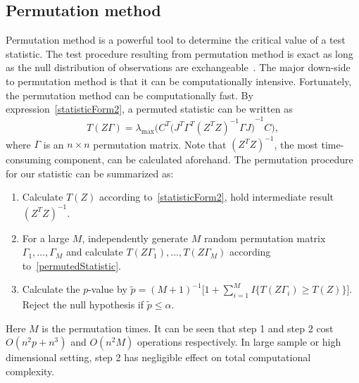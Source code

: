 \documentclass[12pt]{article} %
\theoremstyle{definition}
\begin{document}
\subsection{Permutation method}
Permutation method is a powerful tool to determine the critical value of a test statistic.
   The test procedure resulting from permutation method is exact as long as the null distribution of observations are exchangeable~\citep{Romano1990On}.
   The major down-side to permutation method is that it can be computationally intensive.
   Fortunately,  the permutation method can be computationally fast.
    By expression~\eqref{statisticForm2}, a permuted statistic can be written as
    \begin{equation}\label{permutedStatistic}
        T(Z\Gamma)=\lambda_{\max}\Big(C^T{\big( J^T \Gamma^T {(Z^T Z)}^{-1} \Gamma J \big)}^{-1}  C\Big),
    \end{equation}
where $\Gamma$ is an $n\times n$ permutation matrix.
   Note that ${(Z^T Z)}^{-1}$, the most time-consuming component, can be calculated aforehand.
   The permutation procedure for our statistic can be summarized as:
   \begin{enumerate}
       \item
           Calculate $T(Z)$ according to~\eqref{statisticForm2}, hold intermediate result ${(Z^T Z)}^{-1}$.
       \item For a large $M$, independently generate $M$ random permutation matrix $\Gamma_1,\ldots,\Gamma_M$ and calculate $T(Z\Gamma_1),\ldots,T(Z\Gamma_M)$ according to~\eqref{permutedStatistic}. 
       \item Calculate the $p$-value by
           $
           \tilde{p}={(M+1)}^{-1}\big[1+\sum_{i=1}^M I\{T(Z\Gamma_i)\geq T(Z)\}\big]
           $.
           Reject the null hypothesis if $\tilde{p}\leq \alpha$.
   \end{enumerate}

Here $M$ is the permutation times. 
   It can be seen that  step 1 and step 2 cost $O(n^2 p +n^3)$ and $O(n^2 M)$ operations respectively.
   In large sample or high dimensional setting, step 2 has negligible effect on total computational complexity.
\end{document}
